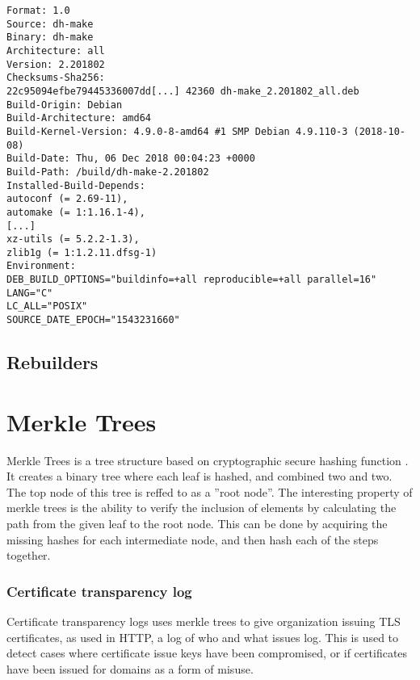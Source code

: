 \documentclass[../Main/thesis.tex]{subfiles}
\begin{document}
    \begin{verbatim}
Format: 1.0
Source: dh-make
Binary: dh-make
Architecture: all
Version: 2.201802
Checksums-Sha256:
22c95094efbe79445336007dd[...] 42360 dh-make_2.201802_all.deb
Build-Origin: Debian
Build-Architecture: amd64
Build-Kernel-Version: 4.9.0-8-amd64 #1 SMP Debian 4.9.110-3 (2018-10-08)
Build-Date: Thu, 06 Dec 2018 00:04:23 +0000
Build-Path: /build/dh-make-2.201802
Installed-Build-Depends:
autoconf (= 2.69-11),
automake (= 1:1.16.1-4),
[...]
xz-utils (= 5.2.2-1.3),
zlib1g (= 1:1.2.11.dfsg-1)
Environment:
DEB_BUILD_OPTIONS="buildinfo=+all reproducible=+all parallel=16"
LANG="C"
LC_ALL="POSIX"
SOURCE_DATE_EPOCH="1543231660"
    \end{verbatim}

    \subsection*{Rebuilders}%


\section{Merkle Trees}
Merkle Trees is a tree structure based on cryptographic secure hashing function
\cite{ralph-c.-merkle-1998}. It creates a binary tree where each leaf is hashed,
and combined two and two. The top node of this tree is reffed to as a ''root
node''. The interesting property of merkle trees is the ability to verify the
inclusion of elements by calculating the path from the given leaf to the root
node. This can be done by acquiring the missing hashes for each intermediate
node, and then hash each of the steps together.


    \subsubsection*{Certificate transparency log}
    Certificate transparency logs uses merkle trees to give organization issuing
    TLS certificates, as used in HTTP, a log of who and what issues
    log.\cite{b.-laurie-a.-langley-e.kaster-google-2013} This is used to detect
    cases where certificate issue keys have been compromised, or if certificates
    have been issued for domains as a form of misuse.
\end{document}
